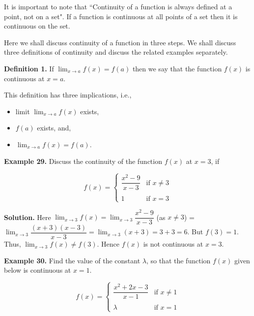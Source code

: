 \documentclass[../../main.tex]{subfiles}
\begin{document}
It is important to note that ``Continuity of a function is always defined at a point, not on a set". If a function is continuous at all points of a set then it is continuous on the set.

Here we shall discuss continuity of a function in three steps. We shall discuss three definitions of continuity and discuss the related examples separately.

\textbf{Definition 1.} If $ \lim _{x\rightarrow a} f(x) = f(a)$ then we say that the function $f(x)$ is continuous at $x=a$.
   
This definition has three implications, i.e., 
\begin{itemize}[leftmargin=5em]
    \item limit $\lim _{x\rightarrow a} f(x)$ exists,
    \item $f(a)$ exists, and,
    \item $\lim _{x\rightarrow a} f(x) = f(a)$.
\end{itemize}

\vspace{0.2cm}
\textbf{Example 29.} 
\vspace{0.2cm}
Discuss the continuity of the function $f(x)$ at $x=3$, if 

\begin{equation*}
f(x) = 
 \begin{cases}
     \dfrac{x^{2}-9}{x-3}   & \text{if   }  x \neq 3 \\\\
     1                      & \text{if  }   x=3
 \end{cases}
\end{equation*}

\textbf{Solution.} Here $\lim_{x\rightarrow 3}{f(x)} = \lim_{x\rightarrow 3}\dfrac{x^2-9}{x-3}$ (as $x\neq 3$) = $\lim_{x\rightarrow 3}\dfrac {(x+3)(x-3)}{x-3} = \lim_{x\rightarrow 3}(x+3)= 3+3 = 6$.
But $f(3)=1$. Thus, $\lim_{x\rightarrow 3}{f(x)} \neq f(3)$. Hence  $f(x)$ is  not continuous at  $x=3$. 

\vspace{0.2cm}
\textbf{Example 30.}
\vspace{0.2cm}
Find the value of the constant $\lambda$, so that the function $f(x)$ given below is continuous at $x=1$.

\begin{equation*}
    f(x) = 
 \begin{cases}
     \dfrac{x^2+2x-3}{x-1}   & \text{if   }  x \neq 1 \\\\
     \lambda                      & \text{if  }   x=1
 \end{cases}
\end{equation*}
 
\end{document}
